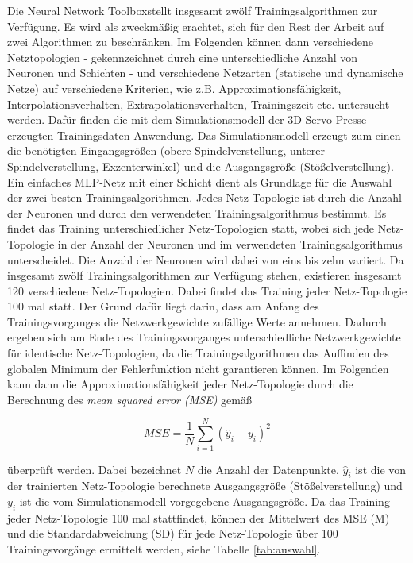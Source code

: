 Die Neural Network Toolbox\texttrademark stellt insgesamt zwölf Trainingsalgorithmen zur Verfügung. Es wird als zweckmäßig erachtet, sich für den Rest der Arbeit auf zwei Algorithmen zu beschränken. Im Folgenden können dann verschiedene Netztopologien - gekennzeichnet durch eine unterschiedliche Anzahl von Neuronen und Schichten - und verschiedene Netzarten (statische und dynamische Netze) auf verschiedene Kriterien, wie z.B. Approximationsfähigkeit, Interpolationsverhalten, Extrapolationsverhalten, Trainingszeit etc. untersucht werden. Dafür finden die mit dem Simulationsmodell der 3D-Servo-Presse erzeugten Trainingsdaten Anwendung. Das Simulationsmodell erzeugt zum einen die benötigten Eingangsgrößen (obere Spindelverstellung, unterer Spindelverstellung, Exzenterwinkel) und die Ausgangsgröße (Stößelverstellung). \\
Ein einfaches MLP-Netz mit einer Schicht dient als Grundlage für die Auswahl der zwei besten Trainingsalgorithmen. Jedes Netz-Topologie ist durch die Anzahl der Neuronen und durch den verwendeten Trainingsalgorithmus bestimmt. Es findet das Training unterschiedlicher Netz-Topologien statt, wobei sich jede Netz-Topologie in der Anzahl der Neuronen und im verwendeten Trainingsalgorithmus unterscheidet. Die Anzahl der Neuronen wird dabei von eins bis zehn variiert. Da insgesamt zwölf Trainingsalgorithmen zur Verfügung stehen, existieren insgesamt 120 verschiedene Netz-Topologien. Dabei findet das Training jeder Netz-Topologie 100 mal statt. Der Grund dafür liegt darin, dass am Anfang des Trainingsvorganges die  Netzwerkgewichte zufällige Werte annehmen. Dadurch ergeben sich am Ende des Trainingsvorganges unterschiedliche Netzwerkgewichte für identische Netz-Topologien, da die Trainingsalgorithmen das Auffinden des globalen Minimum der Fehlerfunktion nicht garantieren können. Im Folgenden kann dann die Approximationsfähigkeit jeder Netz-Topologie durch die Berechnung des \textit{mean squared error (MSE)} gemäß

\begin{equation}
	MSE = \frac{1}{N} \sum_{i=1}^{N} (\hat{y}_i - y_i)^2
\end{equation}

überprüft werden. Dabei bezeichnet $N$ die Anzahl der Datenpunkte, $\hat{y}_i$ ist die von der trainierten Netz-Topologie berechnete Ausgangsgröße (Stößelverstellung) und $y_i$ ist die vom Simulationsmodell vorgegebene Ausgangsgröße. Da das Training jeder Netz-Topologie 100 mal stattfindet, können der Mittelwert des MSE (M) und die Standardabweichung (SD) für jede Netz-Topologie über 100 Trainingsvorgänge ermittelt werden, siehe Tabelle \ref{tab:auswahl}.

